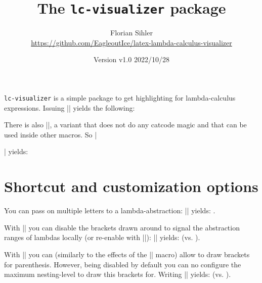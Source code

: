 \documentclass[parskip=half,english,numbers=noenddot,footnotes=nomultiple,oneside]{scrartcl}
\title{The \texttt{lc-visualizer} package}
\author{%
	\texorpdfstring{Florian Sihler\medskip\\[-2mm]
		{\scriptsize\url{https://github.com/EagleoutIce/latex-lambda-calculus-visualizer}}%
	}{Florian Sihler}}
\date{Version v1.0 \textendash{} 2022/10/28}
\begin{document}
   \maketitle

	\texttt{lc-visualizer} is a simple package to get highlighting for lambda-calculus expressions.
   Issuing || yields the following:


   There is also |\RLC|, a variant that does not do any catcode magic and that can be used inside other macros. So |\centerline{\RLC{\Y \equiv \\f\.\(\\x\.\f (\x \x\)\) \(\\x\.\f \(\x \x\)\)}}| yields:

   \centerline{\RLC{\Y \equiv \\f\.\(\\x\.\f \(\x \x\)\) \(\\x\.\f \(\x \x\)\)}}

   \section{Shortcut and customization options}
      You can pass on multiple letters to a lambda-abstraction: || yields: .

      With |\lcDisableLambdaRanges| you can disable the brackets drawn around to signal the abstraction ranges of lambdas locally (or re-enable with |\lcEnableLambdaRanges|):
      |{\lcDisableLambdaRanges{}}| yields: {\lcDisableLambdaRanges{}} (vs. ).

      With |\lcMaximumParenthesisRangeDrawDepth| you can (similarly to the effects of the |\lcDisableLambdaRanges| macro) allow to draw brackets for parenthesis.
      However, being disabled by default you can no configure the maximum nesting-level to draw this brackets for.
      Writing |{\lcDisableLambdaRanges{}}| yields: {\lcDisableLambdaRanges{}} (vs. {\lcDisableLambdaRanges{}}).
\end{document}
